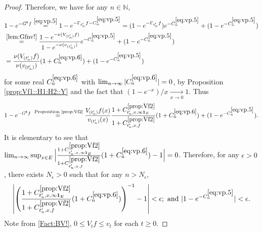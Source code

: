 \documentclass[12pt,a4paper]{amsart}
\numberwithin{equation}{section}
\theoremstyle{plain}
\theoremstyle{definition}
\theoremstyle{remark}
\begin{document}
\begin{proof}
	Therefore, we have for any $n \in \mathbb N$,
\begin{align}
	& 1 - e^{- G^{\mathbf t}f}
	\overset{\eqref{eq:vp.5}}= 1 - e^{- \Gamma_{t'_n} f  - C^{\eqref{eq:vp.5}}_n} %
	= (1 - e^{- \Gamma_{t'_n} f }) e^{- C^{\eqref{eq:vp.5}}_n} + (1 - e^{-C_n^{\eqref{eq:vp.5}}}) %
	\\&\overset{\eqref{lem:Gfnv!}}= \frac{1 - e^{- \nu( V_{(t_n')}f)}}{1- e^{- \nu(v_{(t_n')})}}  e^{ - C^{\eqref{eq:vp.5}}_n} + (1 - e^{-C_n^{\eqref{eq:vp.5}}}) %
	\\& \label{eq:vp.6}= \frac{\nu (V_{(t_n')} f)}{\nu(v_{(t_n')})}  (1+C^{\eqref{eq:vp.6}}_n) + (1 - e^{-C_n^{\eqref{eq:vp.5}}}) %
\end{align}
	for some real $C^{\eqref{eq:vp.6}}_n$ with $\lim_{n\to \infty} |C^{\eqref{eq:vp.6}}_n| =0$, by Proposition \ref{prop:Vf1::H1:H2::Y} and the fact that $(1- e^{-x})/x \xrightarrow[x\to 0]{}1$.
	Thus
\begin{equation} \label{eq:vp.61}
	1 - e^{- G^{\mathbf t}f}
	\overset{\text{ Proposition \ref{prop:Vf2}}}=  \frac{V_{(t_n')}f(x)}{v_{(t_n')}(x)} \frac{1+C^{\ref{prop:Vf2}}_{t_n',x,\infty \mathbf 1_E}}{1+C^{\ref{prop:Vf2}}_{t_n',x,f}} (1+C^{\eqref{eq:vp.6}}_n) + (1 - e^{-C_n^{\eqref{eq:vp.5}}}).
\end{equation}
	It is elementary to see that $\lim_{n\to \infty} \sup_{x\in E} \Big|\frac{1+C^{\ref{prop:Vf2}}_{t_n',x,\infty \mathbf 1_E}}{1+C^{\ref{prop:Vf2}}_{t_n',x,f}} (1+C^{\eqref{eq:vp.6}}_n) -1 \Big| = 0$.
	Therefore, for any $\epsilon > 0$, there exists $N_\epsilon>0$ such that for any $n>N_\epsilon$, 
\begin{equation} \label{eq:vp.62}
	\left| \left(\frac{1+C^{\ref{prop:Vf2}}_{t_n',x,\infty \mathbf 1_E}}{1+C^{\ref{prop:Vf2}}_{t_n',x,f}} (1+C^{\eqref{eq:vp.6}}_n)\right)^{-1} -1 \right| < \epsilon; 
	\text{~and~} |1 - e^{-C_n^{\eqref{eq:vp.5}}}| < \epsilon.
\end{equation}
	Note from \eqref{Fact:BV!}, $0 \leq V_tf \leq v_t$ for each $t\geq 0$.

\end{proof}
\end{document}
